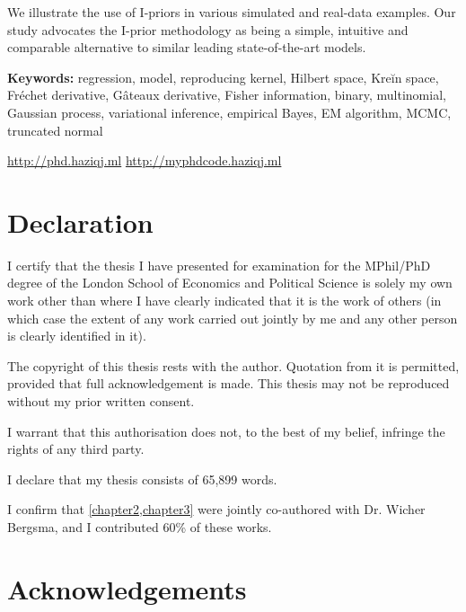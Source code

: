\documentclass[11pt,twoside,openright,showframe]{report}
\begin{document}
We illustrate the use of I-priors in various simulated and real-data examples. 
Our study advocates the I-prior methodology as being a simple, intuitive and comparable alternative to similar leading state-of-the-art models. 


\vspace{1em}
{\noindent\textbf{Keywords:} 
	regression, model, reproducing kernel, Hilbert space, Kreĭn space, Fréchet derivative, Gâteaux derivative, Fisher information, binary, multinomial, Gaussian process, variational inference, empirical Bayes, EM algorithm, MCMC, truncated normal
}

\vfill

\begin{center}
  \url{http://phd.haziqj.ml} \textbullet{} \url{http://myphdcode.haziqj.ml}
\end{center}

\chapter*{Declaration} 

I certify that the thesis I have presented for examination for the MPhil/PhD degree of the London School of Economics and Political Science is solely my own work other than where I have clearly indicated that it is the work of others (in which case the extent of any work carried out jointly by me and any other person is clearly identified in it).

The copyright of this thesis rests with the author. Quotation from it is permitted, provided that full acknowledgement is made. 
This thesis may not be reproduced without my prior written consent.

I warrant that this authorisation does not, to the best of my belief, infringe the rights of any third party.

I declare that my thesis consists of 65,899 words.

I confirm that \cref{chapter2,chapter3} were jointly co-authored with Dr. Wicher Bergsma, and I contributed 60\% of these works.


\chapter*{Acknowledgements} 
\end{document}
